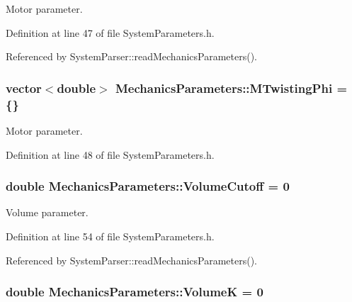 Motor parameter. 



Definition at line 47 of file System\+Parameters.\+h.



Referenced by System\+Parser\+::read\+Mechanics\+Parameters().

\hypertarget{structMechanicsParameters_abff44b81c046945ed8277a522b741ac8}{
\subsubsection[{M\+Twisting\+Phi}]{\setlength{\rightskip}{0pt plus 5cm}vector$<$double$>$ Mechanics\+Parameters\+::\+M\+Twisting\+Phi = \{\}}}\label{structMechanicsParameters_abff44b81c046945ed8277a522b741ac8}


Motor parameter. 



Definition at line 48 of file System\+Parameters.\+h.

\hypertarget{structMechanicsParameters_a597ef187ef21d3eca159e00264bf425c}{
\subsubsection[{Volume\+Cutoff}]{\setlength{\rightskip}{0pt plus 5cm}double Mechanics\+Parameters\+::\+Volume\+Cutoff = 0}}\label{structMechanicsParameters_a597ef187ef21d3eca159e00264bf425c}


Volume parameter. 



Definition at line 54 of file System\+Parameters.\+h.



Referenced by System\+Parser\+::read\+Mechanics\+Parameters().

\hypertarget{structMechanicsParameters_a49a5ad4e84d9c8acafc8bd38018245d1}{
\subsubsection[{Volume\+K}]{\setlength{\rightskip}{0pt plus 5cm}double Mechanics\+Parameters\+::\+Volume\+K = 0}}\label{structMechanicsParameters_a49a5ad4e84d9c8acafc8bd38018245d1}


